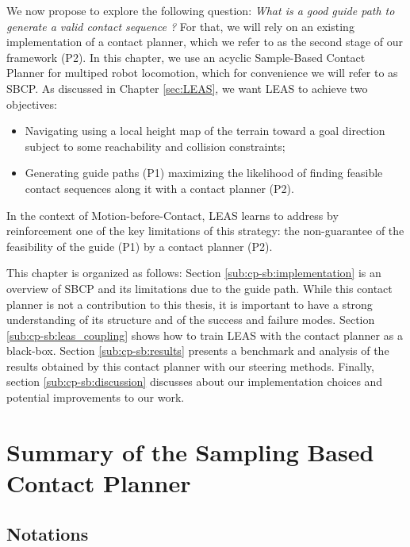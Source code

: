 We now propose to explore the following question: \textit{What is a good guide path to generate a valid contact sequence ?}
For that, we will rely on an existing implementation of a contact planner, which we refer to as the second stage of our framework (P2). 
In this chapter, we use an acyclic Sample-Based Contact Planner \cite{AcyclicCP} for multiped robot locomotion, which for convenience we will refer to as SBCP.
As discussed in Chapter \ref{sec:LEAS}, we want LEAS to achieve two objectives:
\begin{itemize}
    \item Navigating using a local height map of the terrain toward a goal direction subject to some reachability and collision constraints;
    \item Generating guide paths (P1) maximizing the likelihood of finding feasible contact sequences along it with a contact planner (P2).
\end{itemize}
In the context of Motion-before-Contact, LEAS learns to address by reinforcement one of the key limitations of this strategy: the non-guarantee of the feasibility of the guide (P1) by a contact planner (P2).

This chapter is organized as follows:
Section \ref{sub:cp-sb:implementation} is an overview of SBCP and its limitations due to the guide path. While this contact planner is not a contribution to this thesis, it is important to have a strong understanding of its structure and of the success and failure modes.
Section \ref{sub:cp-sb:leas_coupling} shows how to train LEAS with the contact planner as a black-box. 
Section \ref{sub:cp-sb:results} presents a benchmark and analysis of the results obtained by this contact planner with our steering methods.
Finally, section \ref{sub:cp-sb:discussion} discusses about our implementation choices and potential improvements to our work.


\section{Summary of the Sampling Based Contact Planner \label{sub:cp-sb:implementation}}

\subsection{Notations}

